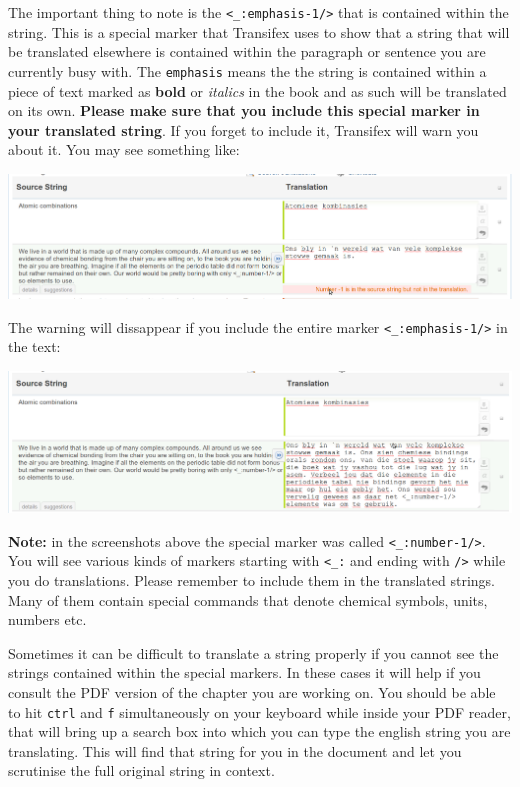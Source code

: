 \documentclass[10pt, a4paper]{article}
\begin{document}
The important thing to note is the \verb|<_:emphasis-1/>| that is contained within the string. This is a special marker that Transifex uses to show that a string that will be translated elsewhere is contained within the paragraph or sentence you are currently busy with. The \texttt{emphasis} means the the string is contained within a piece of text marked as \textbf{bold} or \textit{italics} in the book and as such will be translated on its own. \textbf{Please make sure that you include this special marker in your translated string}. If you forget to include it, Transifex will warn you about it. You may see something like:
\begin{center}
    \centerline{\includegraphics[width=0.8\paperwidth]{images/extra_tags.png}}
\end{center}
The warning will dissappear if you include the entire marker \verb|<_:emphasis-1/>| in the text:
\begin{center}
    \centerline{\includegraphics[width=0.8\paperwidth]{images/extra_tags-2.png}}
\end{center}
\textbf{Note:} in the screenshots above the special marker was called \verb|<_:number-1/>|. You will see various kinds of markers starting with \verb|<_:| and ending with \verb|/>| while you do translations. Please remember to include them in the translated strings. Many of them contain special commands that denote chemical symbols, units, numbers etc.

Sometimes it can be difficult to translate a string properly if you cannot see the strings contained within the special markers. In these cases it will help if you consult the PDF version of the chapter you are working on. You should be able to hit \texttt{ctrl} and \texttt{f} simultaneously on your keyboard while inside your PDF reader, that will bring up a search box into which you can type the english string you are translating. This will find that string for you in the document and let you scrutinise the full original string in context.
\end{document}
